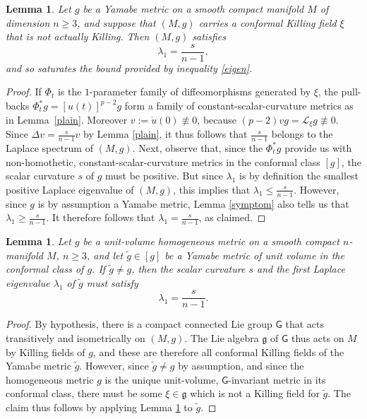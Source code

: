 \documentclass[10pt,a4paper]{amsart}
\numberwithin{equation}{section}
\newtheorem{Lemma}[Theorem]{Lemma}
\begin{document}
\begin{Lemma} \label{evident}
Let $g$ be a Yamabe metric on a smooth compact manifold $M$ of dimension $n\geq 3$, and suppose
that $(M,g)$ carries a {conformal} Killing field $\xi$ that is {not} actually Killing. Then $(M,g)$ satisfies
\begin{equation*}
\lambda_1 = \frac{s}{n-1},
\end{equation*}
and so saturates the bound provided by inequality \eqref{eigen}.
\end{Lemma}
\begin{proof} If $\Phi_t$ is the $1$-parameter family of diffeomorphisms generated by $\xi$, the pull-backs $ \Phi_t^*g= [u (t)]^{p-2}g$
 form a family of constant-scalar-curvature metrics as in Lemma~\ref{plain}. Moreover
 $v:= \dot{u}(0)\not\equiv 0$, because $(p-2) vg= \mathscr{L}_\xi g\not\equiv 0$.
Since $\Delta v = \frac{s}{n-1} v$ by Lemma \ref{plain}, it thus follows that
$\frac{s}{n-1}$ belongs to the Laplace spectrum of $(M,g)$. Next, observe that, since the $\Phi_t^*g$ provide us with non-homothetic,
 constant-scalar-curvature
metrics in the conformal class $[g]$, the scalar curvature $s$ of $g$ must be positive. But since
$\lambda_1$ is by definition the smallest positive Laplace eigenvalue of $(M,g)$, this implies that $\lambda_1 \leq \frac{s}{n-1}$.
However, since $g$ is by assumption a Yamabe metric, Lemma \ref{symptom} also tells us that
$\lambda_1 \geq \frac{s}{n-1}$.
It therefore follows that $\lambda_1 = \frac{s}{n-1}$, as claimed.
\end{proof}

\begin{Lemma}\label{test}
 Let ${g}$ be a unit-volume homogeneous metric on a smooth compact $n$-manifold $M$, $n\geq 3$, and let
 $\tilde{g}\in [{g}]$ be a Yamabe metric of unit volume in the conformal class of ${g}$. If $\tilde{g}\neq {g}$, then the scalar curvature $s$
 and the first Laplace eigenvalue $\lambda_1$ of $\tilde{g}$ must satisfy
 \begin{equation*}
 \lambda_1 = \frac{s}{n-1}.
\end{equation*}
 \end{Lemma}
\begin{proof} By hypothesis, there is a compact connected Lie group $\mathsf{G}$ that acts transitively and isometrically on $(M, {g})$.
The Lie algebra $\mathfrak{g}$ of $\mathsf{G}$ thus acts on $M$ by Killing fields of ${g}$, and these are therefore all conformal Killing fields of
the Yamabe metric $\tilde{g}$. However, since $\tilde{g}\neq {g}$ by assumption, and since the homogeneous metric ${g}$ is the unique unit-volume,
$\mathsf{G}$-invariant metric in its conformal class, there must be some $\xi \in \mathfrak{g}$ which is not
a Killing field for $\tilde{g}$. The claim thus follows by applying Lemma \ref{evident} to $\tilde{g}$. \end{proof}
\end{document}
